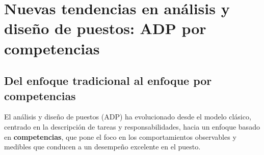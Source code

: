 %
%
%
%
%

\section{Nuevas tendencias en análisis y diseño de puestos: ADP por competencias}

\subsection{Del enfoque tradicional al enfoque por competencias}

El análisis y diseño de puestos (ADP) ha evolucionado desde el modelo
clásico, centrado en la descripción de tareas y responsabilidades, hacia
un enfoque basado en \textbf{competencias}, que pone el foco en los
comportamientos observables y medibles que conducen a un desempeño
excelente en el puesto.

